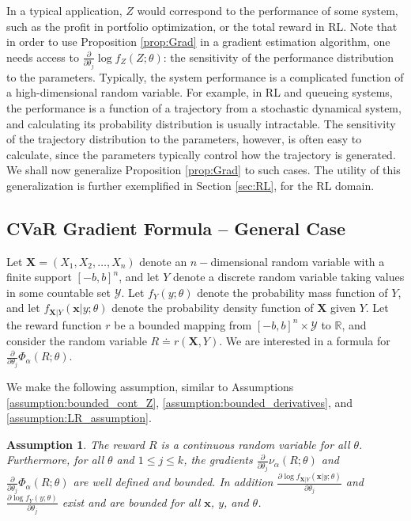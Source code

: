 \documentclass[letterpaper]{article}
\newcommand{\R}{\mathbb{R}}
\newcommand{\cvar}{\Phi_\alpha}
\newcommand{\var}{\nu_\alpha}
\newcommand{\cY}{\mathcal{Y}}
\newcommand{\bx}{\mathbf{x}}
\newcommand{\bX}{\mathbf{X}}
\newcommand{\Dth}{\frac{\partial}{\partial \theta_j}}
\newcommand{\Dt}[1]{\frac{\partial {#1}}{\partial \theta_j}}
\newtheorem{assumption}{Assumption}
\begin{document}
In a typical application, $Z$ would correspond to the performance of some system, such as the profit in portfolio optimization, or the total reward in RL. Note that in order to use Proposition \ref{prop:Grad} in a gradient estimation algorithm, one needs access to $\Dth \log f_Z(Z;\theta)$: the sensitivity of the performance distribution to the parameters. Typically, the system performance is a complicated function of a high-dimensional random variable. For example, in RL and queueing systems, the performance is a function of a trajectory from a stochastic dynamical system, and calculating its probability distribution is usually intractable. The sensitivity of the trajectory distribution to the parameters, however, is often easy to calculate, since the parameters typically control how the trajectory is generated. We shall now generalize Proposition \ref{prop:Grad} to such cases. The utility of this generalization is further exemplified in Section \ref{sec:RL}, for the RL domain.

\subsection{CVaR Gradient Formula -- General Case}\label{ssec:multi-D_formula}

Let $\bX=(X_1,X_2,\dots,X_n)$ denote an $n-$dimensional random variable with a finite support $[-b,b]^n$, and let $Y$ denote a discrete random variable taking values in some countable set $\cY$. Let $f_{Y}(y;\theta)$ denote the probability mass function of $Y$, and let $f_{\bX|Y}(\bx|y;\theta)$ denote the probability density function of $\bX$ given $Y$. Let the reward function $r$ be a bounded mapping from $[-b,b]^n \times \cY$ to $\R$, and consider the random variable $R \doteq r(\bX,Y)$. We are interested in a formula for $\Dth \cvar (R;\theta)$.

We make the following assumption, similar to Assumptions \ref{assumption:bounded_cont_Z}, \ref{assumption:bounded_derivatives}, and \ref{assumption:LR_assumption}.
\begin{assumption}\label{assumption:bounded_cont_rZ}
The reward $R$ is a continuous random variable for all $\theta$. Furthermore, for all $\theta$ and $1 \leq j \leq k$, the gradients $\Dth \var (R;\theta)$ and $\Dth \cvar (R;\theta)$ are well defined and bounded. In addition $\Dt{ \log f_{\bX|Y}\left(\bx|y;\theta\right)}$ and $\Dt{ \log f_{Y}\left(y;\theta\right)}$ exist and are bounded for all $\bx$, $y$, and $\theta$.
\end{assumption}
\end{document}
